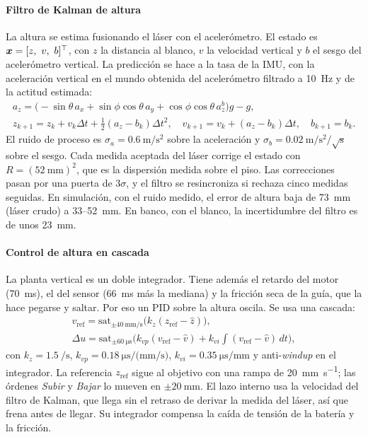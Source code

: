 \paragraph{Filtro de Kalman de altura} La altura se estima fusionando el láser con el acelerómetro. El estado es $\bm{x}=[z,\ v,\ b]^{\top}$, con $z$ la distancia al blanco, $v$ la velocidad vertical y $b$ el sesgo del acelerómetro vertical. La predicción se hace a la tasa de la IMU, con la aceleración vertical en el mundo obtenida del acelerómetro filtrado a \SI{10}{\hertz} y de la actitud estimada:
\begin{equation}
  \begin{gathered}
    a_z=\big(-\sin\theta\,a_x+\sin\phi\cos\theta\,a_y+\cos\phi\cos\theta\,a_z^{b}\big)g-g,\\
    z_{k+1}=z_k+v_k\Delta t+\tfrac12(a_z-b_k)\Delta t^2,\quad
    v_{k+1}=v_k+(a_z-b_k)\Delta t,\quad b_{k+1}=b_k .
  \end{gathered}
  \label{eq:kfz}
\end{equation}
El ruido de proceso es $\sigma_a=\SI{0.6}{\metre\per\second\squared}$ sobre la aceleración y $\sigma_b=\SI{0.02}{\metre\per\second\squared}/\sqrt{\mathrm{s}}$ sobre el sesgo. Cada medida aceptada del láser corrige el estado con $R=(\SI{52}{\milli\metre})^2$, que es la dispersión medida sobre el piso. Las correcciones pasan por una puerta de $3\sigma$, y el filtro se resincroniza si rechaza cinco medidas seguidas. En simulación, con el ruido medido, el error de altura baja de \SI{73}{\milli\metre} (láser crudo) a 33--\SI{52}{\milli\metre}. En banco, con el blanco, la incertidumbre del filtro es de unos \SI{23}{\milli\metre}.

\paragraph{Control de altura en cascada} La planta vertical es un doble integrador. Tiene además el retardo del motor (\SI{70}{\milli\second}), el del sensor (\SI{66}{\milli\second} más la mediana) y la fricción seca de la guía, que la hace pegarse y saltar. Por eso un PID sobre la altura oscila. Se usa una cascada:
\begin{equation}
  \begin{gathered}
    v_{\mathrm{ref}}=\mathrm{sat}_{\pm\SI{40}{\milli\metre\per\second}}\!\big(k_z(z_{\mathrm{ref}}-\hat z)\big),\\
    \Delta u=\mathrm{sat}_{\pm\SI{60}{\micro\second}}\!\Big(k_{vp}(v_{\mathrm{ref}}-\hat v)+k_{vi}\!\int(v_{\mathrm{ref}}-\hat v)\,dt\Big),
  \end{gathered}
  \label{eq:cascada}
\end{equation}
con $k_z=\SI{1.5}{\per\second}$, $k_{vp}=\SI{0.18}{\micro\second\per(\milli\metre\per\second)}$, $k_{vi}=\SI{0.35}{\micro\second\per\milli\metre}$ y anti-\emph{windup} en el integrador. La referencia $z_{\mathrm{ref}}$ sigue al objetivo con una rampa de \SI{20}{\milli\metre\per\second}; las órdenes \emph{Subir} y \emph{Bajar} lo mueven en $\pm\SI{20}{\milli\metre}$. El lazo interno usa la velocidad del filtro de Kalman, que llega sin el retraso de derivar la medida del láser, así que frena antes de llegar. Su integrador compensa la caída de tensión de la batería y la fricción.

